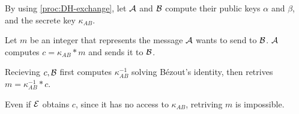 \documentclass{subfiles}
\begin{document}
    \begin{procedure}
        \caption{ElGamal()}\label{proc:ElGamal}
        \nl By using \autoref{proc:DH-exchange}, let $\operatorname{\mathcal{A}}$ and $\operatorname{\mathcal{B}}$ compute their public keys 
            $\alpha$ and $\beta$, and the secrete key $\kappa_{AB}$.
            \DontPrintSemicolon\;

        \nl Let $m$ be an integer that represents the message $\operatorname{\mathcal{A}}$ wants to send to $\operatorname{\mathcal{B}}$.
            $\operatorname{\mathcal{A}}$ computes $c = \kappa_{AB} * m$ and sends it to $\operatorname{\mathcal{B}}$.
            \DontPrintSemicolon\;

        \nl Recieving $c, \operatorname{\mathcal{B}}$ first computes $\kappa_{AB}^{-1}$ solving Bézout's identity,
            then retrives $m = \kappa_{AB}^{-1} * c$.
            \DontPrintSemicolon\;

        \nl Even if $\operatorname{\mathcal{E}}$ obtains $c$, since it has no access to $\kappa_{AB}$,
            retriving $m$ is impossible.
    \end{procedure}
\end{document}
